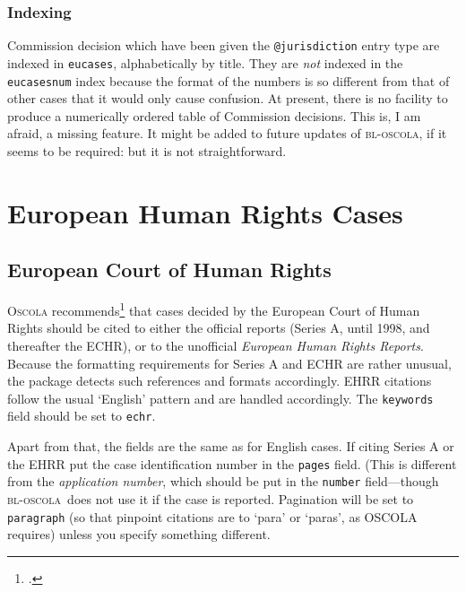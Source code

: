\documentclass[a4paper,
               11pt,
	       DIV=1,			   
	       footinclude=false]
	      {scrartcl}
\newcommand{\oscola}{\textsc{bl-oscola}}
\begin{document}

\subsubsection{Indexing}

Commission decision which have been given the \texttt{@jurisdiction}
entry type are indexed in \texttt{eucases}, alphabetically by
title. They are \emph{not} indexed in the \texttt{eucasesnum} index
because the format of the numbers is so different from that of other
cases that it would only cause confusion. At present, there is no
facility to produce a numerically ordered table of Commission
decisions. This is, I am afraid, a missing feature. It might be added
to future updates of \oscola, if it seems to be required: but it is
not straightforward.


\section{European Human Rights Cases}

\subsection{European Court of Human Rights}

\textsc{Oscola} recommends\footcite[31]{oscola} that cases decided by the
European Court of Human Rights should be cited to either the official
reports (Series A, until 1998, and thereafter the ECHR), or to the
unofficial \emph{European Human Rights Reports}. Because the
formatting requirements for Series A and ECHR are rather unusual, the
package detects such references and formats accordingly. EHRR
citations follow the usual `English' pattern and are handled
accordingly. The \texttt{keywords} field should be set to \texttt{echr}.

Apart from that, the fields are the same as for English cases. If
citing Series A or the EHRR put the case identification number in the
\texttt{pages} field. (This is different from the \emph{application
  number}, which should be put in the \texttt{number} field---though
\oscola\ does not use it if the case is reported. Pagination will be
set to \texttt{paragraph} (so that pinpoint citations are to `para' or
`paras', as OSCOLA requires) unless you specify something different.
\end{document}
